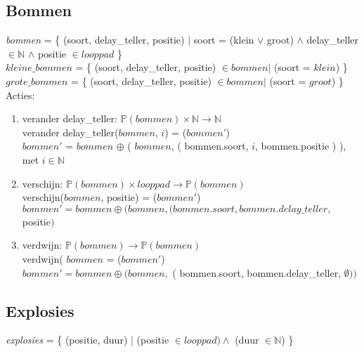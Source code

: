 


\subsection{Bommen}\label{sec:bom} %
\emph{bommen} = \{ (soort, delay\_teller, positie) $|$ soort = (klein $\lor$ groot) $\land$ delay\_teller $\in \mathbb{N}$ $\land$ positie $\in looppad$ \} \\
$kleine\_bommen$ = \{ (soort, delay\_teller, positie) $\in bommen |$ (soort = $klein$) \} \\
$grote\_bommen$ = \{ (soort, delay\_teller, positie) $\in bommen |$ (soort = $groot$)  \} \\


Acties:
\begin{enumerate}
 \item verander delay\_teller: $\mathbb{P}(bommen) \times \mathbb{N}  \rightarrow \mathbb{N}$ \\
       verander delay\_teller($bommen$, $i$) = ($bommen$')  \\
       $bommen'$ = $bommen$ $\oplus$ ( $bommen$, ( bommen.soort, $i$, bommen.positie ) ), met $i \in \mathbb{N}$ \\
 \item verschijn: $\mathbb{P}(bommen) \times looppad  \rightarrow \mathbb{P}(bommen)$ \\
       verschijn($bommen$, positie) = ($bommen'$) \\
       $bommen' = bommen \oplus ( bommen, $$(bommen.soort, bommen.delay\_teller, $positie$ )$ \\
 \item verdwijn: $ \mathbb{P}(bommen)\rightarrow \mathbb{P}(bommen)$ \\
       verdwijn( $bommen$ = ($bommen'$) \\
       $bommen' = bommen \oplus ( bommen,$ ( bommen.soort, bommen.delay\_teller, $\emptyset ) )$ \\
\end{enumerate}


\subsection{Explosies}\label{sub:explosie} %

\emph{explosies} = \{ (positie, duur) $|$ (positie $\in looppad) \land$ (duur $\in \mathbb{N}$) \}


